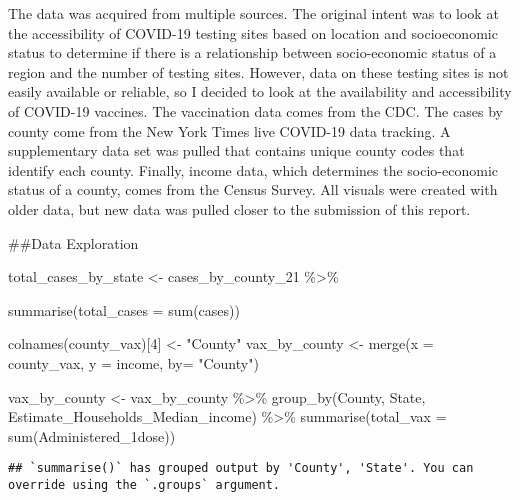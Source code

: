 \documentclass[
]{article}
\newenvironment{Shaded}{\begin{snugshade}}{\end{snugshade}}
\newcommand{\AttributeTok}[1]{\textcolor[rgb]{0.77,0.63,0.00}{#1}}
\newcommand{\DecValTok}[1]{\textcolor[rgb]{0.00,0.00,0.81}{#1}}
\newcommand{\FunctionTok}[1]{\textcolor[rgb]{0.00,0.00,0.00}{#1}}
\newcommand{\NormalTok}[1]{#1}
\newcommand{\OtherTok}[1]{\textcolor[rgb]{0.56,0.35,0.01}{#1}}
\newcommand{\SpecialCharTok}[1]{\textcolor[rgb]{0.00,0.00,0.00}{#1}}
\newcommand{\StringTok}[1]{\textcolor[rgb]{0.31,0.60,0.02}{#1}}
\begin{document}
The data was acquired from multiple sources. The original intent was to
look at the accessibility of COVID-19 testing sites based on location
and socioeconomic status to determine if there is a relationship between
socio-economic status of a region and the number of testing sites.
However, data on these testing sites is not easily available or
reliable, so I decided to look at the availability and accessibility of
COVID-19 vaccines. The vaccination data comes from the CDC. The cases by
county come from the New York Times live COVID-19 data tracking. A
supplementary data set was pulled that contains unique county codes that
identify each county. Finally, income data, which determines the
socio-economic status of a county, comes from the Census Survey. All
visuals were created with older data, but new data was pulled closer to
the submission of this report.

\#\#Data Exploration

\begin{Shaded}
\begin{Highlighting}[]
\NormalTok{total\_cases\_by\_state }\OtherTok{\textless{}{-}}\NormalTok{ cases\_by\_county\_21 }\SpecialCharTok{\%\textgreater{}\%}
  
  \FunctionTok{summarise}\NormalTok{(}\AttributeTok{total\_cases =} \FunctionTok{sum}\NormalTok{(cases))}

\FunctionTok{colnames}\NormalTok{(county\_vax)[}\DecValTok{4}\NormalTok{] }\OtherTok{\textless{}{-}} \StringTok{"County"}
\NormalTok{vax\_by\_county }\OtherTok{\textless{}{-}} \FunctionTok{merge}\NormalTok{(}\AttributeTok{x =}\NormalTok{ county\_vax, }\AttributeTok{y =}\NormalTok{ income, }\AttributeTok{by=} \StringTok{"County"}\NormalTok{)}

\NormalTok{vax\_by\_county }\OtherTok{\textless{}{-}}\NormalTok{ vax\_by\_county }\SpecialCharTok{\%\textgreater{}\%}
  \FunctionTok{group\_by}\NormalTok{(County, State, Estimate\_Households\_Median\_income) }\SpecialCharTok{\%\textgreater{}\%}
  \FunctionTok{summarise}\NormalTok{(}\AttributeTok{total\_vax =} \FunctionTok{sum}\NormalTok{(Administered\_1dose))}
\end{Highlighting}
\end{Shaded}

\begin{verbatim}
## `summarise()` has grouped output by 'County', 'State'. You can override using the `.groups` argument.
\end{verbatim}
\end{document}
